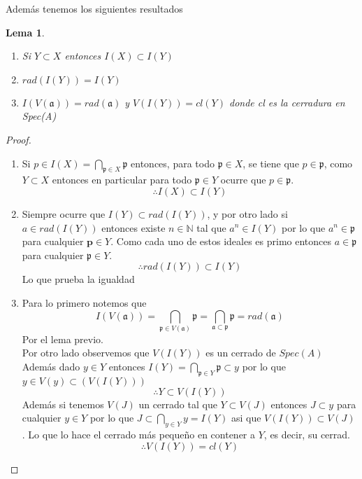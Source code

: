\documentclass{article}
\newtheorem{lema}{Lema}
\begin{document}
Además tenemos los siguientes resultados

\begin{lema}
    \begin{enumerate}
    \item Si $Y \subset X$ entonces $I(X) \subset I(Y)$
    \item $rad(I(Y)) = I(Y)$
    \item $I(V(\mathfrak{a})) = rad(\mathfrak{a}) $
    y $V(I(Y)) = cl(Y)$ donde cl es la cerradura en Spec(A)
    \end{enumerate}
\end{lema}
\begin{proof}
    \begin{enumerate}
        \item Si $p \in I(X) = \bigcap_{\mathfrak{p}\in X}\mathfrak{p}$
        entonces, para todo $\mathfrak{p}\in X$, se tiene que $p\in \mathfrak{p}$,
        como $Y \subset X$ entonces en particular para todo $\mathfrak{p}\in Y$
        ocurre que $p \in \mathfrak{p}$.
        $$\therefore I(X) \subset I(Y)$$
        \item Siempre ocurre que $I(Y)\subset rad(I(Y))$, y por otro lado
        si $a \in rad(I(Y))$ entonces existe $n\in \mathbb{N}$ tal que $a^n \in I(Y)$
        por lo que $a^n \in \mathfrak{p}$ para cualquier $\mathbf{p}\in Y$. 
        Como cada uno de estos ideales es primo entonces $a \in \mathfrak{p}$ para cualquier 
        $\mathfrak{p}\in Y$.
        $$\therefore rad(I(Y)) \subset I(Y)$$
        Lo que prueba la igualdad
        \item Para lo primero notemos que
        $$I(V(\mathfrak{a}))=\bigcap_{\mathfrak{p}\in V(\mathfrak{a})} \mathfrak{p}
        = \bigcap_{\mathfrak{a}\subset \mathfrak{p}} \mathfrak{p}
        = rad(\mathfrak{a})$$
        Por el lema previo.
        \\
        Por otro lado observemos que $V(I(Y))$ es un cerrado de $Spec(A)$
        Además dado $y\in Y$ entonces $I(Y) = \bigcap_{\mathfrak{p}\in Y} \mathfrak{p}
        \subset y $ por lo que $y \in V(y) \subset (V(I(Y)))$
        $$\therefore Y\subset V(I(Y))$$
        Además si tenemos $V(J)$ un cerrado tal que $Y \subset V(J)$ entonces
        $J \subset y$ para cualquier $y \in Y$ por lo que $J \subset \bigcap_{y \in Y} y = I(Y)$
        asi que $V(I(Y)) \subset V(J)$.
        Lo que lo hace el cerrado más pequeño en contener a $Y$, es decir,
        su cerrad.
        $$\therefore V(I(Y)) = cl(Y)$$
    \end{enumerate}
\end{proof}
\end{document}
